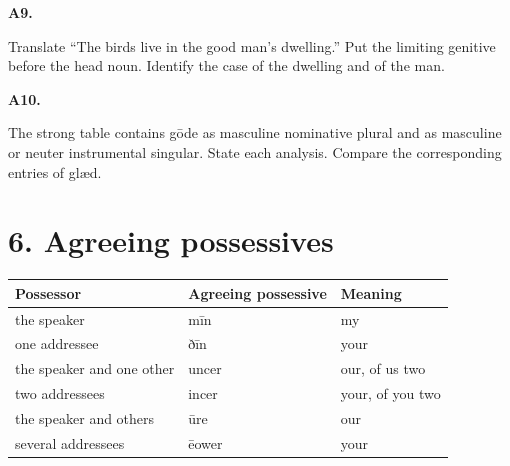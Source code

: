 \par\begin{minipage}{\linewidth}\raggedright
\textbf{A9.}

Translate “The birds live in the good man’s dwelling.” Put the limiting genitive before the head noun. Identify the case of the dwelling and of the man.

\end{minipage}\par\addvspace{4pt}

\par\begin{minipage}{\linewidth}\raggedright
\textbf{A10.}

The strong table contains gōde as masculine nominative plural and as masculine or neuter instrumental singular. State each analysis. Compare the corresponding entries of glæd.

\end{minipage}\par\addvspace{4pt}

\section*{6. Agreeing possessives}

\par\begingroup
\fontsize{10.5}{13.2}\selectfont
\setlength{\LTleft}{0pt}\setlength{\LTright}{\fill}
\noindent
\begin{tabular}{@{}>{\raggedright\arraybackslash}p{47.38mm}>{\raggedright\arraybackslash}p{39.74mm}>{\raggedright\arraybackslash}p{31.26mm}@{}}
\toprule
\textbf{Possessor} & \textbf{Agreeing possessive} & \textbf{Meaning} \\
\midrule
the speaker & mīn & my \\
one addressee & ðīn & your \\
the speaker and one other & uncer & our, of us two \\
two addressees & incer & your, of you two \\
the speaker and others & ūre & our \\
several addressees & ēower & your \\
\bottomrule
\end{tabular}
\par\endgroup

